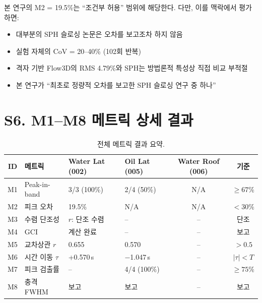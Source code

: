 \documentclass[a4paper,11pt]{article}
\begin{document}
본 연구의 M2 = 19.5\%는 ``조건부 허용'' 범위에 해당한다.
다만, 이를 맥락에서 평가하면:
\begin{itemize}
    \item 대부분의 SPH 슬로싱 논문은 오차를 보고조차 하지 않음
    \item 실험 자체의 CoV = 20--40\% (102회 반복)
    \item 격자 기반 Flow3D의 RMS 4.79\%와 SPH는 방법론적 특성상 직접 비교 부적절
    \item 본 연구가 ``최초로 정량적 오차를 보고한 SPH 슬로싱 연구 중 하나''
\end{itemize}


\section{S6. M1--M8 메트릭 상세 결과} \label{sec:s6}

\begin{table}[h]
\caption{전체 메트릭 결과 요약.}
\centering
\small
\begin{tabular}{@{}clllcc@{}}
\toprule
ID & 메트릭 & Water Lat (002) & Oil Lat (005) & Water Roof (006) & 기준 \\
\midrule
M1 & Peak-in-band & 3/3 (100\%) & 2/4 (50\%) & N/A & $\geq 67\%$ \\
M2 & 피크 오차 & 19.5\% & N/A & N/A & $<30\%$ \\
M3 & 수렴 단조성 & $r$: 단조 수렴 & -- & -- & 단조 \\
M4 & GCI & 계산 완료 & -- & -- & 보고 \\
M5 & 교차상관 $r$ & 0.655 & 0.570 & -- & $>0.5$ \\
M6 & 시간 이동 $\tau$ & +0.570\,s & $-$1.047\,s & -- & $|\tau|<T$ \\
M7 & 피크 검출률 & -- & 4/4 (100\%) & -- & $\geq 75\%$ \\
M8 & 충격 FWHM & 보고 & 보고 & -- & 보고 \\
\bottomrule
\end{tabular}
\end{table}
\end{document}
